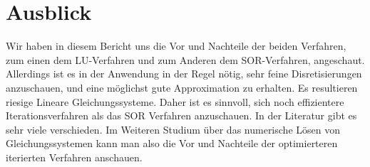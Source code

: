 \documentclass[smallheadings]{scrartcl}
\theoremstyle{definition}
\begin{document}
\section{Ausblick}
Wir haben in diesem Bericht uns die Vor und Nachteile der beiden Verfahren, zum einen dem LU-Verfahren und zum Anderen dem SOR-Verfahren, angeschaut.  Allerdings ist es in der Anwendung in der Regel nötig,  sehr feine Disretisierungen anzuschauen, und eine möglichst gute Approximation zu erhalten.  Es resultieren riesige Lineare Gleichungssysteme. Daher ist es sinnvoll, sich noch effizientere Iterationsverfahren als das SOR Verfahren anzuschauen. In der Literatur gibt es sehr viele verschieden. Im Weiteren Studium über das numerische Lösen von Gleichungssystemen kann man also die Vor und Nachteile der optimierteren iterierten Verfahren anschauen. 



\printbibliography

\end{document}
